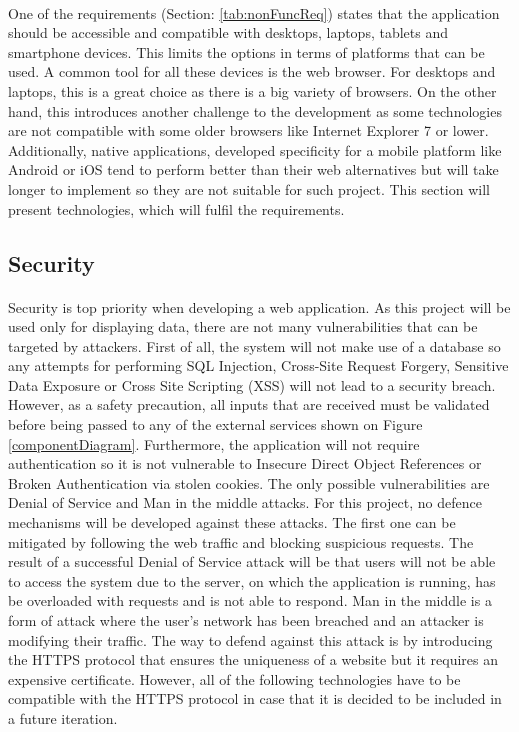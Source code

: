 \documentclass{l4proj}
\begin{document}
\paragraph{}
One of the requirements (Section: \ref{tab:nonFuncReq}) states that the application should be accessible and compatible with desktops, laptops, tablets and smartphone devices. This limits the options in terms of platforms that can be used. A common tool for all these devices is the web browser. For desktops and laptops, this is a great choice as there is a big variety of browsers. On the other hand, this introduces another challenge to the development as some technologies are not compatible with some older browsers like Internet Explorer 7 or lower. Additionally, native applications, developed specificity for a mobile platform like Android or iOS tend to perform better than their web alternatives but will take longer to implement so they are not suitable for such project. This section will present technologies, which will fulfil the requirements.

\subsection{Security}
\paragraph{}
Security is top priority when developing a web application. As this project will be used only for displaying data, there are not many vulnerabilities that can be targeted by attackers. First of all, the system will not make use of a database so any attempts for performing SQL Injection, Cross-Site Request Forgery, Sensitive Data Exposure or Cross Site Scripting (XSS) will not lead to a security breach. However, as a safety precaution, all inputs that are received must be validated before being passed to any of the external services shown on Figure \ref{componentDiagram}. Furthermore, the application will not require authentication so it is not vulnerable to Insecure Direct Object References or Broken Authentication via stolen cookies. The only possible vulnerabilities are Denial of Service and Man in the middle attacks. For this project, no defence mechanisms will be developed against these attacks. The first one can be mitigated by following the web traffic and blocking suspicious requests. The result of a successful Denial of Service attack will be that users will not be able to access the system due to the server, on which the application is running, has be overloaded with requests and is not able to respond. Man in the middle is a form of attack where the user's network has been breached and an attacker is modifying their traffic. The way to defend against this attack is by introducing the HTTPS protocol that ensures the uniqueness of a website but it requires an expensive certificate. However, all of the following technologies have to be compatible with the HTTPS protocol in case that it is decided to be included in a future iteration.   
\end{document}
